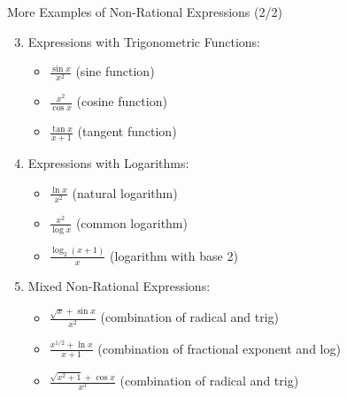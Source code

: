 \documentclass[aspectratio=169]{beamer}
\begin{document}

\begin{frame}{More Examples of Non-Rational Expressions (2/2)}
\begin{tcolorbox}[colback=lightgray,colframe=accent,title=Examples: Trig, Logarithms, Mixed]
\footnotesize
\begin{enumerate}
  \setcounter{enumi}{2}
  \item Expressions with Trigonometric Functions:
  \begin{itemize}
    \item $\frac{\sin x}{x^2}$ (sine function)
    \item $\frac{x^2}{\cos x}$ (cosine function)
    \item $\frac{\tan x}{x+1}$ (tangent function)
  \end{itemize}

  \item Expressions with Logarithms:
  \begin{itemize}
    \item $\frac{\ln x}{x^2}$ (natural logarithm)
    \item $\frac{x^2}{\log x}$ (common logarithm)
    \item $\frac{\log_2(x+1)}{x}$ (logarithm with base 2)
  \end{itemize}

  \item Mixed Non-Rational Expressions:
  \begin{itemize}
    \item $\frac{\sqrt{x} + \sin x}{x^2}$ (combination of radical and trig)
    \item $\frac{x^{1/2} + \ln x}{x+1}$ (combination of fractional exponent and log)
    \item $\frac{\sqrt{x^2+1} + \cos x}{x^3}$ (combination of radical and trig)
  \end{itemize}
\end{enumerate}
\end{tcolorbox}
\end{frame}

\end{document}
